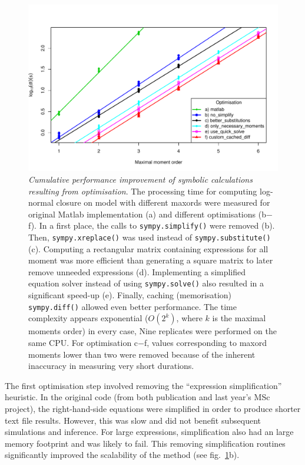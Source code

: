 \begin{figure}[tbh]
\begin{centering}
\includegraphics[width=0.95\textwidth{}]{mea_speed.pdf}
\caption{\emph{Cumulative performance improvement of symbolic
calculations resulting from optimisation}.
The processing time for computing log-normal closure on \pft{} model with different \gls{maxord}s were measured for original Matlab implementation (a) and different optimisations (b$-$f).
In a first place, the calls to \texttt{sympy.simplify()} were removed (b).
Then, \texttt{sympy.xreplace()} was used instead of \texttt{sympy.substitute()} (c).
Computing a rectangular matrix containing expressions for all moment was more efficient than generating a square matrix to later remove unneeded expressions (d).
Implementing a simplified equation solver instead of using \texttt{sympy.solve()} also resulted in a significant speed-up (e).
Finally, caching (memorisation) \texttt{sympy.diff()} allowed even better performance.
The time complexity appears exponential ($O(2^k)$, where $k$ is the maximal moments order) in every case,
Nine replicates were performed on the same CPU.
For optimisation c$-$f, values corresponding to \gls{maxord} moments lower than two were removed because of
the inherent inaccuracy in measuring very short durations.}
\label{fig:mea_speed}
\end{centering}
\end{figure}


The first optimisation step involved removing the ``expression simplification'' heuristic.
In the original code (from both publication\cite{ale_general_2013} and last year's MSc project\cite{babtie_moment_2013}),
the right-hand-side equations were simplified in order to produce shorter text file results.
However, this was slow and did not benefit subsequent simulations and inference.
For large expressions, simplification also had an large memory footprint and was likely to fail.
This removing simplification routines significantly improved the scalability of the method (see fig.~\ref{fig:mea_speed}b).

